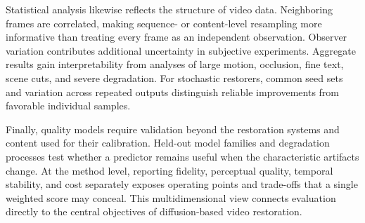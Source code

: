 Statistical analysis likewise reflects the structure of video data. Neighboring frames are correlated, making sequence- or content-level resampling more informative than treating every frame as an independent observation. Observer variation contributes additional uncertainty in subjective experiments. Aggregate results gain interpretability from analyses of large motion, occlusion, fine text, scene cuts, and severe degradation. For stochastic restorers, common seed sets and variation across repeated outputs distinguish reliable improvements from favorable individual samples.

Finally, quality models require validation beyond the restoration systems and content used for their calibration. Held-out model families and degradation processes test whether a predictor remains useful when the characteristic artifacts change. At the method level, reporting fidelity, perceptual quality, temporal stability, and cost separately exposes operating points and trade-offs that a single weighted score may conceal. This multidimensional view connects evaluation directly to the central objectives of diffusion-based video restoration.
